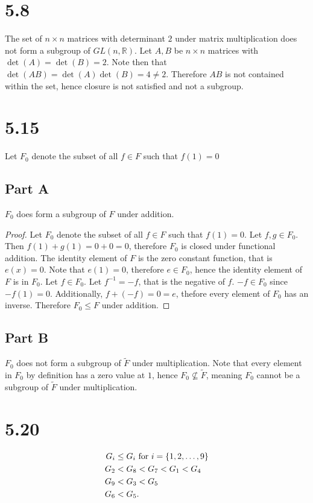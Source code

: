 \documentclass[12pt]{extarticle}
\begin{document}
\DeclarePairedDelimiter\bangle\langle\rangle

\section*{5.8}
The set of $n \times n$ matrices with determinant $2$ under matrix multiplication does not form a subgroup of $GL(n, \mathbb{R})$. Let $A,B$ be $n \times n$ matrices with $\det(A) = \det(B) = 2$. Note then that $\det(AB) = \det(A) \det(B) = 4 \neq 2$. Therefore $AB$ is not contained within the set, hence closure is not satisfied and not a subgroup.

\section*{5.15}
Let $F_0$ denote the subset of all $f \in F$ such that $f(1) = 0$
\subsection*{Part A}
$F_0$ does form a subgroup of $F$ under addition.
\begin{proof}
	Let $F_0$ denote the subset of all $f \in F$ such that $f(1) = 0$. Let $f,g \in F_0$. Then $f(1) + g(1) = 0 + 0 = 0$, therefore $F_0$ is closed under functional addition. The identity element of $F$ is the zero constant function, that is $e(x) = 0$. Note that $e(1) = 0$, therefore $e \in F_0$, hence the identity element of $F$ is in $F_0$. Let $f \in F_0$. Let $f^{-1} = -f$, that is the negative of $f$. $-f \in F_0$ since $-f(1) = 0$. Additionally, $f + (-f) = 0 = e$, thefore every element of $F_0$ has an inverse. Therefore $F_0 \leq F$ under addition.
\end{proof}

\subsection*{Part B}
$F_0$ does not form a subgroup of $\tilde{F}$ under multiplication. Note that every element in $F_0$ by definition has a zero value at $1$, hence $F_0 \nsubseteq \tilde{F}$, meaning $F_0$ cannot be a subgroup of $\tilde{F}$ under multiplication.

\section*{5.20}
\begin{align*}
	G_i &\leq G_i \text{ for } i = \qty{1, 2, \ldots , 9} \\
	G_2 &< G_8 < G_7 < G_1 < G_4 \\
	G_9 &< G_3 < G_5 \\
	G_6 &< G_5
.\end{align*}
\end{document}
